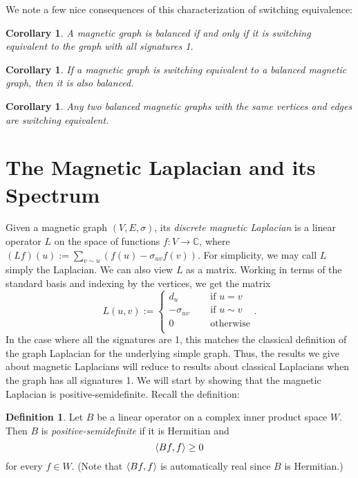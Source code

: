 \documentclass{article}
\newtheorem{corollary}[thm]{Corollary}
\theoremstyle{definition}
\newtheorem{defn}[thm]{Definition}
\newcommand{\C}{\mathbb C}
\DeclarePairedDelimiter\inner{\langle}{\rangle}
\begin{document}
We note a few nice consequences of this characterization of switching equivalence:

\begin{corollary}\label{balanced iff switching equivalent to simple graph}
    A magnetic graph is balanced if and only if it is switching equivalent to the graph with all signatures 1.
\end{corollary}

\begin{corollary}
    If a magnetic graph is switching equivalent to a balanced magnetic graph, then it is also balanced.  
\end{corollary}

\begin{corollary}
    Any two balanced magnetic graphs with the same vertices and edges are switching equivalent. 
\end{corollary}

\section{The Magnetic Laplacian and its Spectrum}

Given a magnetic graph $(V, E, \sigma)$, its \textit{discrete magnetic Laplacian} is a linear operator $L$ on the space of functions $f: V \rightarrow \C$, where $(L f)(u) := \sum_{v \sim u} (f(u) - \sigma_{uv} f(v))$. For simplicity, we may call $L$ simply the Laplacian. We can also view $L$ as a matrix. Working in terms of the standard basis and indexing by the vertices, we get the matrix 
$$
L(u, v) := 
\begin{cases}
d_u \quad & \mbox{ if $u = v$} \\
-\sigma_{uv} \quad & \mbox{ if $u \sim v$} \\
0 \quad & \mbox{ otherwise} \\
\end{cases}.
$$
In the case where all the signatures are 1, this matches the classical definition of the graph Laplacian for the underlying simple graph. Thus, the results we give about magnetic Laplacians will reduce to results about classical Laplacians when the graph has all signatures 1. We will start by showing that the magnetic Laplacian is positive-semidefinite. Recall the definition:

\begin{defn}
    Let $B$ be a linear operator on a complex inner product space $W$. Then $B$ is \textit{positive-semidefinite} if it is Hermitian and $$\inner*{ Bf, f } \geq 0$$ for every $f \in W$. (Note that $\inner*{ Bf, f }$ is automatically real since $B$ is Hermitian.)
\end{defn}
\end{document}
